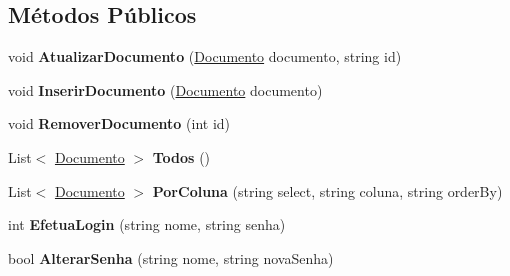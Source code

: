 \subsection*{Métodos Públicos}
\begin{DoxyCompactItemize}
\item 
\hypertarget{interface_sistema_r_h_1_1_i_adaptador_a00b31acb9f17c41e3010b81210d80e3a}{
void {\bfseries AtualizarDocumento} (\hyperlink{class_sistema_r_h_1_1_documento}{Documento} documento, string id)}
\label{interface_sistema_r_h_1_1_i_adaptador_a00b31acb9f17c41e3010b81210d80e3a}

\item 
\hypertarget{interface_sistema_r_h_1_1_i_adaptador_a5b2e814d3103c4f2220e649c003e9446}{
void {\bfseries InserirDocumento} (\hyperlink{class_sistema_r_h_1_1_documento}{Documento} documento)}
\label{interface_sistema_r_h_1_1_i_adaptador_a5b2e814d3103c4f2220e649c003e9446}

\item 
\hypertarget{interface_sistema_r_h_1_1_i_adaptador_a9a701db6c0e7c67738ccb25f8cb681a0}{
void {\bfseries RemoverDocumento} (int id)}
\label{interface_sistema_r_h_1_1_i_adaptador_a9a701db6c0e7c67738ccb25f8cb681a0}

\item 
\hypertarget{interface_sistema_r_h_1_1_i_adaptador_af13fd0ccce6a983ebcbcb332afe3f897}{
List$<$ \hyperlink{class_sistema_r_h_1_1_documento}{Documento} $>$ {\bfseries Todos} ()}
\label{interface_sistema_r_h_1_1_i_adaptador_af13fd0ccce6a983ebcbcb332afe3f897}

\item 
\hypertarget{interface_sistema_r_h_1_1_i_adaptador_a5c06901c86c9adb2ccf10dce8e7f4790}{
List$<$ \hyperlink{class_sistema_r_h_1_1_documento}{Documento} $>$ {\bfseries PorColuna} (string select, string coluna, string orderBy)}
\label{interface_sistema_r_h_1_1_i_adaptador_a5c06901c86c9adb2ccf10dce8e7f4790}

\item 
\hypertarget{interface_sistema_r_h_1_1_i_adaptador_a0ee97425dadae1f749c4e723cfb06e23}{
int {\bfseries EfetuaLogin} (string nome, string senha)}
\label{interface_sistema_r_h_1_1_i_adaptador_a0ee97425dadae1f749c4e723cfb06e23}

\item 
\hypertarget{interface_sistema_r_h_1_1_i_adaptador_a2762ff75efce372d733731cdbce5b21f}{
bool {\bfseries AlterarSenha} (string nome, string novaSenha)}
\label{interface_sistema_r_h_1_1_i_adaptador_a2762ff75efce372d733731cdbce5b21f}


\end{DoxyCompactItemize}
